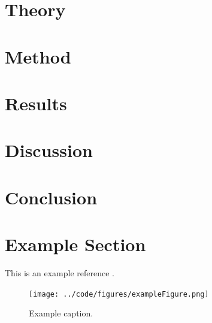 \documentclass[a4paper, titlepage]{article}
\begin{document}
\section{Theory}

\section{Method}

\section{Results}

\section{Discussion}

\section{Conclusion}

\clearpage


\clearpage
\appendix

\section{Example Section}
This is an example reference \citep{glad00}.

\begin{figure}[h!]
\center
\texttt{[image: ../code/figures/exampleFigure.png]}
\caption{Example caption.}
\label{fig:exampleLable}
\end{figure}


\end{document}
